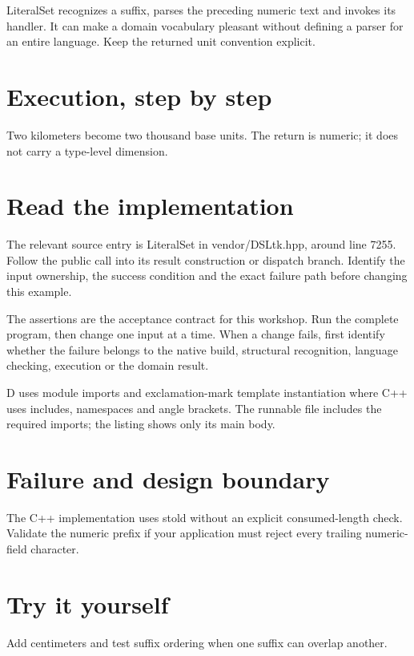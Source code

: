 \clearpage
{}
LiteralSet recognizes a suffix, parses the preceding numeric text and invokes its handler. It can make a domain vocabulary pleasant without defining a parser for an entire language. Keep the returned unit convention explicit.


\section*{Execution, step by step}
Two kilometers become two thousand base units. The return is numeric; it does not carry a type-level dimension.

\section*{Read the implementation}
The relevant source entry is LiteralSet in vendor/DSLtk.hpp, around line 7255. Follow the public call into its result construction or dispatch branch. Identify the input ownership, the success condition and the exact failure path before changing this example.

The assertions are the acceptance contract for this workshop. Run the complete program, then change one input at a time. When a change fails, first identify whether the failure belongs to the native build, structural recognition, language checking, execution or the domain result.

\clearpage
{}
D uses module imports and exclamation-mark template instantiation where C++ uses includes, namespaces and angle brackets. The runnable file includes the required imports; the listing shows only its main body.


\section*{Failure and design boundary}
The C++ implementation uses stold without an explicit consumed-length check. Validate the numeric prefix if your application must reject every trailing numeric-field character.

\section*{Try it yourself}
Add centimeters and test suffix ordering when one suffix can overlap another.

